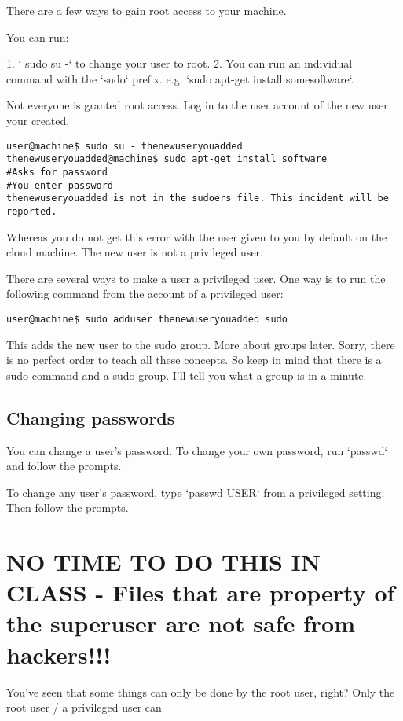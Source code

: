 \documentclass[10pt]{article}
\begin{document}
There are a few ways to gain root access to your machine.

You can run:

1. ` sudo su -` to change your user to root.
2. You can run an individual command with the `sudo` prefix. e.g. `sudo apt-get install somesoftware`.

Not everyone is granted root access. Log in to the user account of the new user your created.

\begin{lstlisting}[style=term]
user@machine$ sudo su - thenewuseryouadded
thenewuseryouadded@machine$ sudo apt-get install software
#Asks for password
#You enter password
thenewuseryouadded is not in the sudoers file. This incident will be reported.
\end{lstlisting}

Whereas you do not get this error with the user given to you by default on the cloud machine. The new user is not a privileged user.

There are several ways to make a user a privileged user. One way is to run the following command from the account of a privileged user:

\begin{lstlisting}[style=term]
user@machine$ sudo adduser thenewuseryouadded sudo
\end{lstlisting}

This adds the new user to the sudo group. More about groups later. Sorry, there
is no perfect order to teach all these concepts. So keep in mind that there is a
sudo command and a sudo group. I'll tell you what a group is in a minute.

\subsection{Changing passwords}

You can change a user's password. To change your own password, run `passwd` and follow the prompts.

To change any user's password, type `passwd USER` from a privileged setting. Then follow the prompts.

\section{ {\color{blue} NO TIME TO DO THIS IN CLASS -  Files that are property
of the superuser are not safe from hackers!!! }}

You've seen that some things can only be done by the root user, right? Only the root user / a privileged user can
\end{document}
